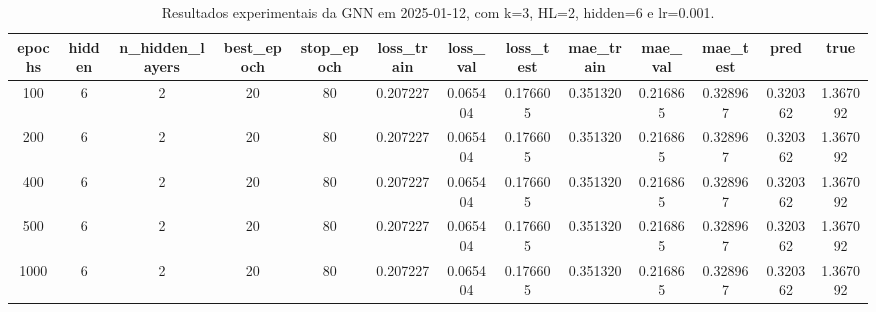 \begin{table}[h]
\centering
\caption{Resultados experimentais da GNN em 2025-01-12, com k=3, HL=2, hidden=6 e lr=0.001.}
\label{tab:gnn_results_k3_hl2_h6_d20250112}
\begin{tabular}{ccccccccccccc}
\toprule
epochs & hidden & n\_hidden\_layers & best\_epoch & stop\_epoch & loss\_train & loss\_val & loss\_test & mae\_train & mae\_val & mae\_test & pred & true \\
\midrule
100 & 6 & 2 & 20 & 80 & 0.207227 & 0.065404 & 0.176605 & 0.351320 & 0.216865 & 0.328967 & 0.320362 & 1.367092 \\
200 & 6 & 2 & 20 & 80 & 0.207227 & 0.065404 & 0.176605 & 0.351320 & 0.216865 & 0.328967 & 0.320362 & 1.367092 \\
400 & 6 & 2 & 20 & 80 & 0.207227 & 0.065404 & 0.176605 & 0.351320 & 0.216865 & 0.328967 & 0.320362 & 1.367092 \\
500 & 6 & 2 & 20 & 80 & 0.207227 & 0.065404 & 0.176605 & 0.351320 & 0.216865 & 0.328967 & 0.320362 & 1.367092 \\
1000 & 6 & 2 & 20 & 80 & 0.207227 & 0.065404 & 0.176605 & 0.351320 & 0.216865 & 0.328967 & 0.320362 & 1.367092 \\
\bottomrule
\end{tabular}
\end{table}
